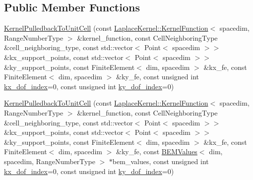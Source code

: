 \subsection*{Public Member Functions}
\begin{DoxyCompactItemize}
\item 
\hyperlink{classLaplaceBEM_1_1KernelPulledbackToUnitCell_a344ad653c5e57498cc005b5b683e8db6}{Kernel\+Pulledback\+To\+Unit\+Cell} (const \hyperlink{classLaplaceBEM_1_1LaplaceKernel_1_1KernelFunction}{Laplace\+Kernel\+::\+Kernel\+Function}$<$ spacedim, Range\+Number\+Type $>$ \&kernel\+\_\+function, const Cell\+Neighboring\+Type \&cell\+\_\+neighboring\+\_\+type, const std\+::vector$<$ Point$<$ spacedim $>$$>$ \&kx\+\_\+support\+\_\+points, const std\+::vector$<$ Point$<$ spacedim $>$$>$ \&ky\+\_\+support\+\_\+points, const Finite\+Element$<$ dim, spacedim $>$ \&kx\+\_\+fe, const Finite\+Element$<$ dim, spacedim $>$ \&ky\+\_\+fe, const unsigned int \hyperlink{classLaplaceBEM_1_1KernelPulledbackToUnitCell_a66ba57ad86025978e5e5580c822aef89}{kx\+\_\+dof\+\_\+index}=0, const unsigned int \hyperlink{classLaplaceBEM_1_1KernelPulledbackToUnitCell_ae6f3e4bc6cf09546bf11d01812f9b692}{ky\+\_\+dof\+\_\+index}=0)
\item 
\hyperlink{classLaplaceBEM_1_1KernelPulledbackToUnitCell_a3ef9d5f4401cc8d6bd7c11955fadb770}{Kernel\+Pulledback\+To\+Unit\+Cell} (const \hyperlink{classLaplaceBEM_1_1LaplaceKernel_1_1KernelFunction}{Laplace\+Kernel\+::\+Kernel\+Function}$<$ spacedim, Range\+Number\+Type $>$ \&kernel\+\_\+function, const Cell\+Neighboring\+Type \&cell\+\_\+neighboring\+\_\+type, const std\+::vector$<$ Point$<$ spacedim $>$$>$ \&kx\+\_\+support\+\_\+points, const std\+::vector$<$ Point$<$ spacedim $>$$>$ \&ky\+\_\+support\+\_\+points, const Finite\+Element$<$ dim, spacedim $>$ \&kx\+\_\+fe, const Finite\+Element$<$ dim, spacedim $>$ \&ky\+\_\+fe, const \hyperlink{classLaplaceBEM_1_1BEMValues}{B\+E\+M\+Values}$<$ dim, spacedim, Range\+Number\+Type $>$ $\ast$bem\+\_\+values, const unsigned int \hyperlink{classLaplaceBEM_1_1KernelPulledbackToUnitCell_a66ba57ad86025978e5e5580c822aef89}{kx\+\_\+dof\+\_\+index}=0, const unsigned int \hyperlink{classLaplaceBEM_1_1KernelPulledbackToUnitCell_ae6f3e4bc6cf09546bf11d01812f9b692}{ky\+\_\+dof\+\_\+index}=0)
\item 

\end{DoxyCompactItemize}
